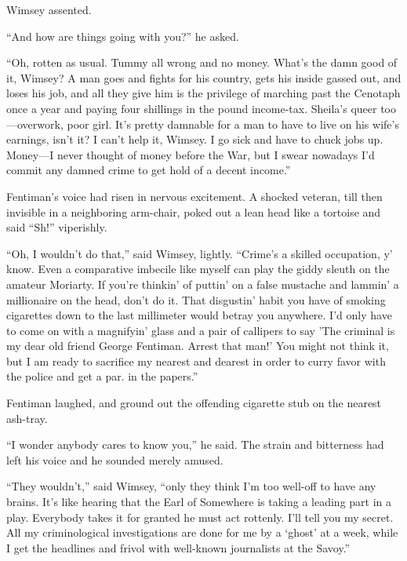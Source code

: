 Wimsey assented.

\enquote{And how are things going with you?} he asked.

\enquote{Oh, rotten as usual. Tummy all wrong and no money. What's the damn good of it, Wimsey? A man goes and fights for his country, gets his inside gassed out, and loses his job, and all they give him is the privilege of marching past the Cenotaph once a year and paying four shillings in the pound income-tax. Sheila's queer too\allowbreak---\allowbreak overwork, poor girl. It's pretty damnable for a man to have to live on his wife's earnings, isn't it? I can't help it, Wimsey. I go sick and have to chuck jobs up. Money\allowbreak---\allowbreak I never thought of money before the War, but I swear nowadays I'd commit any damned crime to get hold of a decent income.}

Fentiman's voice had risen in nervous excitement. A shocked veteran, till then invisible in a neighboring arm-chair, poked out a lean head like a tortoise and said \enquote{Sh!} viperishly.

\enquote{Oh, I wouldn't do that,} said Wimsey, lightly. \enquote{Crime's a skilled occupation, y' know. Even a comparative imbecile like myself can play the giddy sleuth on the amateur Moriarty. If you're thinkin' of puttin' on a false mustache and lammin' a millionaire on the head, don't do it. That disgustin' habit you have of smoking cigarettes down to the last millimeter would betray you anywhere. I'd only have to come on with a magnifyin' glass and a pair of callipers to say 'The criminal is my dear old friend George Fentiman. Arrest that man!' You might not think it, but I am ready to sacrifice my nearest and dearest in order to curry favor with the police and get a par. in the papers.}

Fentiman laughed, and ground out the offending cigarette stub on the nearest ash-tray.

\enquote{I wonder anybody cares to know you,} he said. The strain and bitterness had left his voice and he sounded merely amused.

\enquote{They wouldn't,} said Wimsey, \enquote{only they think I'm too well-off to have any brains. It's like hearing that the Earl of Somewhere is taking a leading part in a play. Everybody takes it for granted he must act rottenly. I'll tell you my secret. All my criminological investigations are done for me by a \enquote{ghost} at  a week, while I get the headlines and frivol with well-known journalists at the Savoy.}

